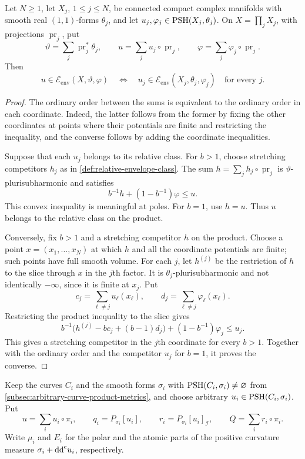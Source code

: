 \begin{lemma}\label{lem:product-relative-envelope-classes}
Let $N\geq1$, let $X_j$, $1\leq j\leq N$, be connected compact complex manifolds with smooth real $(1,1)$-forms $\theta_j$, and let $u_j,\varphi_j\in\mathrm{PSH}(X_j,\theta_j)$. On $X=\prod_jX_j$, with projections $\operatorname{pr}_j$, put
\[
 \vartheta=\sum_j\operatorname{pr}_j^*\theta_j,\qquad
 u=\sum_j u_j\circ\operatorname{pr}_j,\qquad
 \varphi=\sum_j\varphi_j\circ\operatorname{pr}_j.
\]
Then
\[
 u\in\mathcal E_{\mathrm{env}}(X,\vartheta,\varphi)
 \quad\Longleftrightarrow\quad
 u_j\in\mathcal E_{\mathrm{env}}(X_j,\theta_j,\varphi_j)
 \quad\text{for every }j.
\]
\end{lemma}
\begin{proof}
The ordinary order between the sums is equivalent to the ordinary order in each coordinate. Indeed, the latter follows from the former by fixing the other coordinates at points where their potentials are finite and restricting the inequality, and the converse follows by adding the coordinate inequalities.

Suppose that each $u_j$ belongs to its relative class. For $b>1$, choose stretching competitors $h_j$ as in \cref{def:relative-envelope-class}. The sum $h=\sum_jh_j\circ\operatorname{pr}_j$ is $\vartheta$-plurisubharmonic and satisfies
\[
 b^{-1}h+(1-b^{-1})\varphi\leq u.
\]
This convex inequality is meaningful at poles. For $b=1$, use $h=u$. Thus $u$ belongs to the relative class on the product.

Conversely, fix $b>1$ and a stretching competitor $h$ on the product. Choose a point $x=(x_1,\ldots,x_N)$ at which $h$ and all the coordinate potentials are finite; such points have full smooth volume. For each $j$, let $h^{(j)}$ be the restriction of $h$ to the slice through $x$ in the $j$th factor. It is $\theta_j$-plurisubharmonic and not identically $-\infty$, since it is finite at $x_j$. Put
\[
 c_j=\sum_{\ell\ne j}u_\ell(x_\ell),\qquad
 d_j=\sum_{\ell\ne j}\varphi_\ell(x_\ell).
\]
Restricting the product inequality to the slice gives
\[
 b^{-1}\bigl(h^{(j)}-bc_j+(b-1)d_j\bigr)
       +(1-b^{-1})\varphi_j\leq u_j.
\]
This gives a stretching competitor in the $j$th coordinate for every $b>1$. Together with the ordinary order and the competitor $u_j$ for $b=1$, it proves the converse.
\end{proof}

Keep the curves $C_i$ and the smooth forms $\sigma_i$ with $\mathrm{PSH}(C_i,\sigma_i)\ne\varnothing$ from \cref{subsec:arbitrary-curve-product-metrics}, and choose arbitrary $u_i\in\mathrm{PSH}(C_i,\sigma_i)$. Put
\[
 u=\sum_i u_i\circ\pi_i,\qquad
 q_i=P_{\sigma_i}[u_i],\qquad
 r_i=P_{\sigma_i}[u_i]_{\mathcal I},\qquad
 Q=\sum_i r_i\circ\pi_i.
\]
Write $\mu_i$ and $E_i$ for the polar and the atomic parts of the positive curvature measure $\sigma_i+\mathrm{dd}^{\mathrm{c}} u_i$, respectively.

